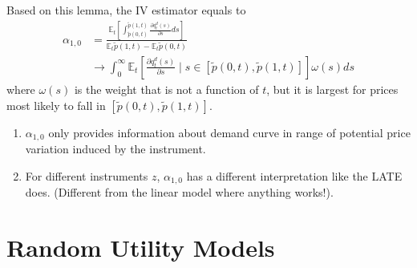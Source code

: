\documentclass[11pt]{elegantbook}
\begin{document}
\begin{theorem}
    Based on this lemma, the IV estimator equals to
    \begin{equation}
        \begin{aligned}
            \alpha_{1,0}&=\frac{\mathbb{E}_t\left[\int_{\tilde{p}(0,t)}^{\tilde{p}(1,t)}\frac{\partial q^d_t(s)}{\partial s}ds\right]}{\mathbb{E}_t\tilde{p}(1,t)-\mathbb{E}_t\tilde{p}(0,t)}\\
            &\rightarrow \int_0^\infty \mathbb{E}_t\left[\frac{\partial q^d_t(s)}{\partial s}\mid s\in[\tilde{p}(0,t),\tilde{p}(1,t)]\right]\omega(s)ds
        \end{aligned}
        \nonumber
    \end{equation}
    where $\omega(s)$ is the weight that is not a function of $t$, but it is largest for prices most likely to fall in $[\tilde{p}(0,t),\tilde{p}(1,t)]$.
\end{theorem}
\begin{note}
    \begin{enumerate}
        \item $\alpha_{1,0}$ only provides information about demand curve in range of potential price variation induced by the instrument.
        \item  For different instruments $z$, $\alpha_{1,0}$ has a different interpretation like the LATE does. (Different from the linear model where anything works!).
    \end{enumerate}
\end{note}




















\chapter{Random Utility Models}
\end{document}
